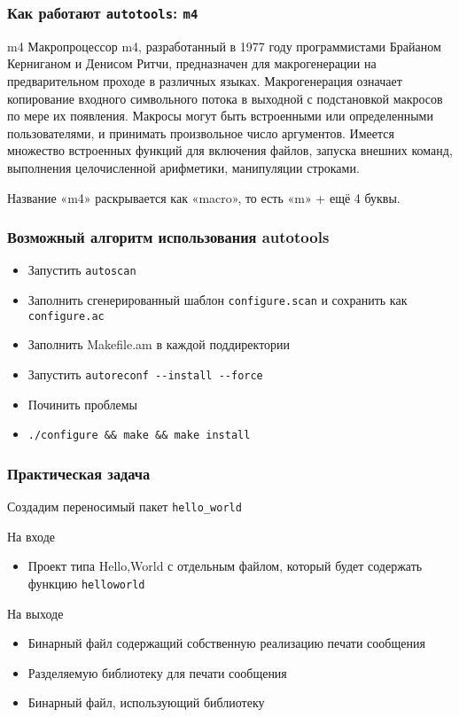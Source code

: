 \begin{frame}
 \frametitle{Как работают \texttt{autotools}: \texttt{m4}}

 \begin{block}{m4}
	 Макропроцессор m4,  разработанный в 1977 году программистами Брайаном Керниганом и Денисом Ритчи,  
	 предназначен для макрогенерации на предварительном проходе в различных языках. 
	 Макрогенерация означает копирование входного символьного потока в выходной с подстановкой макросов 
	 по мере их появления. Макросы могут быть встроенными или определенными пользователями,
	 и принимать произвольное число аргументов. Имеется множество встроенных функций для включения файлов, 
	 запуска внешних команд,  выполнения целочисленной арифметики,  
	 манипуляции строками. 
	 
	 Название «m4» раскрывается как «macro»,  то есть «m» + ещё 4 буквы.
 \end{block}
\end{frame}


\begin{frame}[fragile]
 \frametitle{Возможный алгоритм использования autotools}
 \begin{itemize}
  \item Запустить \texttt{autoscan}
  \item Заполнить сгенерированный шаблон \texttt{configure.scan} и сохранить как \texttt{configure.ac}
  \item Заполнить Makefile.am в каждой поддиректории
  \item Запустить \texttt{autoreconf -{}-install -{}-force}
  \item Починить проблемы
  \item \verb+./configure && make && make install+
 \end{itemize}
\end{frame}

\begin{frame}[fragile]
\frametitle{Практическая задача}

Создадим переносимый пакет {\tt hello\_world}

	\begin{block}{На входе}
	\begin{itemize}
		\item Проект типа Hello,World с отдельным файлом, который будет содержать функцию \texttt{helloworld} 
	\end{itemize}
	\end{block}

	\begin{block}{На выходе}
	\begin{itemize}
		\item Бинарный файл содержащий собственную реализацию печати сообщения
		\item Разделяемую библиотеку для печати сообщения
		\item Бинарный файл, использующий библиотеку
	\end{itemize}
	\end{block}

\end{frame}

